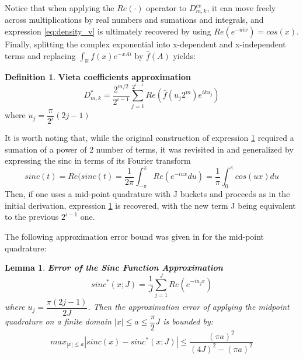 \documentclass[12,twoside]{mammeTFM}
\newtheorem{lem}[thm]{Lemma}
\theoremstyle{definition}
\newtheorem{definition}[thm]{Definition}
\theoremstyle{remark}
\newcommand{\R}{\ensuremath{\mathbb{R}}}
\begin{document}
\begin{itemize}
{\begin{equation}
\end{equation}
Notice that when applying the $Re(\cdot)$ operator to $D_{m,k}^{cv}$, it can move freely across multiplications by real numbers and sumations and integrals, and expression \ref{eq:density_v} is ultimately recovered by using $Re \left(e^{-uix}\right) = cos(x)$. Finally, splitting the complex exponential into x-dependent and x-independent terms and replacing $\int_{\R} f(x) e^{-xAi}$ by $\hat{f}(A)$ yields:
\begin{definition} \textbf{Vieta coefficients approximation}\label{def:vieta}
\begin{equation}
D_{m,k}^{*} =  \dfrac{2^{m / 2}}{2^{\iota-1}} \sum_{j=1}^{2^{\iota-1}} Re \left( \hat{f} \left(u_j 2^{m} \right) e^{ik u_j} \right)
\end{equation}
where $u_j = \dfrac{\pi}{2^{\iota}}(2j - 1)$
\end{definition}
}
\end{itemize} 

It is worth noting that, while the original construction of expression \ref{def:vieta} required a sumation of a power of 2 number of terms, it was revisited in \cite{mar17} and generalized by expressing the sinc in terms of its Fourier transform 
\begin{equation}
sinc(t) = Re(sinc(t) = \dfrac{1}{2\pi} \int_{-\pi}^{\pi} Re \left( e^{-iux} du \right) = \dfrac{1}{\pi} \int_{0}^{\pi} cos(ux) du
\end{equation}
Then, if one uses a mid-point quadrature with J buckets and proceeds as in the initial derivation, expression \ref{def:vieta} is recovered, with the new term J being equivalent to the previous $2^{\iota -1}$ one.

The following approximation error bound was given in \cite{mar17} for the mid-point quadrature:

\begin{lem} \textbf{Error of the Sinc Function Approximation}
\begin{equation} \label{lem:error_sinc}
sinc^{*}(x; J) = \dfrac{1}{J}\sum_{j = 1}^J Re\left( e^{-iu_jx} \right)
\end{equation}
where $u_j = \dfrac{\pi (2j - 1)}{2J}$. Then the approximation error of applying the midpoint quadrature on a finite domain $|x| \leq a \leq \dfrac{\pi}{2}J$ is bounded by:
\begin{equation}
max_{|x| \leq a} \left|sinc(x) - sinc^{*}(x; J) \right| \leq \dfrac{(\pi a)^2}{(4J)^2 - (\pi a)^2}
\end{equation}
\end{lem}
\end{document}
